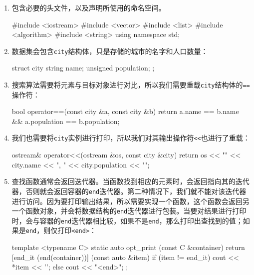 \begin{enumerate}
\item 包含必要的头文件，以及声明所使用的命名空间。

\begin{codebox}[cpp]
#include <iostream>
#include <vector>
#include <list>
#include <algorithm>
#include <string>
using namespace std;
\end{codebox}

\item 数据集会包含\texttt{city}结构体，只是存储的城市的名字和人口数量：

\begin{codebox}[cpp]
struct city {
    string name;
    unsigned population;
};  
\end{codebox}

\item 搜索算法需要将元素与目标对象进行对比，所以我们需要重载\texttt{city}结构体的\texttt{==}操作符：

\begin{codebox}[cpp]
bool operator==(const city &a, const city &b) {
    return a.name == b.name && a.population == b.population;
}
\end{codebox}

\item 我们也需要将\texttt{city}实例进行打印，所以我们对其输出操作符\texttt{<<}也进行了重载：

\begin{codebox}[cpp]
ostream& operator<<(ostream &os, const city &city) {
    return os << "{" << city.name << ", "
        << city.population << "}";
}
\end{codebox}

\item 查找函数通常会返回迭代器。当函数找到相应的元素时，会返回指向其的迭代器，否则就会返回容器的\texttt{end}迭代器。第二种情况下，我们就不能对该迭代器进行访问。因为要打印输出结果，所以需要实现一个函数，这个函数会返回另一个函数对象，并会将数据结构的\texttt{end}迭代器进行包装。当要对结果进行打印时，会与容器的\texttt{end}迭代器相比较，如果不是\texttt{end}，那么打印出查找到的值；如果是\texttt{end}，则仅打印\texttt{<end>}：

\begin{codebox}[cpp]
template <typename C>
static auto opt_print (const C &container)
{
    return [end_it (end(container))] (const auto &item) {
        if (item != end_it) {
            cout << *item << '\n';
        } else {
            cout << "<end>\n";
        }
    };
}
\end{codebox}


\end{enumerate}
